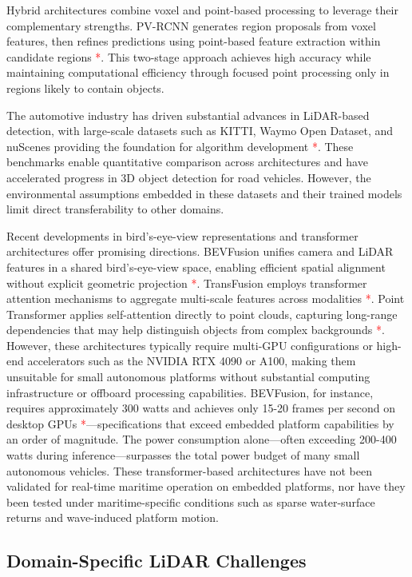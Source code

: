 \documentclass[../main.tex]{subfiles}
\begin{document}
Hybrid architectures combine voxel and point-based processing to leverage their complementary strengths. PV-RCNN generates region proposals from voxel features, then refines predictions using point-based feature extraction within candidate regions \textcolor{red}{*}. This two-stage approach achieves high accuracy while maintaining computational efficiency through focused point processing only in regions likely to contain objects.

The automotive industry has driven substantial advances in LiDAR-based detection, with large-scale datasets such as KITTI, Waymo Open Dataset, and nuScenes providing the foundation for algorithm development \textcolor{red}{*}. These benchmarks enable quantitative comparison across architectures and have accelerated progress in 3D object detection for road vehicles. However, the environmental assumptions embedded in these datasets and their trained models limit direct transferability to other domains.

Recent developments in bird's-eye-view representations and transformer architectures offer promising directions. BEVFusion unifies camera and LiDAR features in a shared bird's-eye-view space, enabling efficient spatial alignment without explicit geometric projection \textcolor{red}{*}. TransFusion employs transformer attention mechanisms to aggregate multi-scale features across modalities \textcolor{red}{*}. Point Transformer applies self-attention directly to point clouds, capturing long-range dependencies that may help distinguish objects from complex backgrounds \textcolor{red}{*}. However, these architectures typically require multi-GPU configurations or high-end accelerators such as the NVIDIA RTX 4090 or A100, making them unsuitable for small autonomous platforms without substantial computing infrastructure or offboard processing capabilities. BEVFusion, for instance, requires approximately 300 watts and achieves only 15-20 frames per second on desktop GPUs \textcolor{red}{*}—specifications that exceed embedded platform capabilities by an order of magnitude. The power consumption alone—often exceeding 200-400 watts during inference—surpasses the total power budget of many small autonomous vehicles. These transformer-based architectures have not been validated for real-time maritime operation on embedded platforms, nor have they been tested under maritime-specific conditions such as sparse water-surface returns and wave-induced platform motion.

\subsection{Domain-Specific LiDAR Challenges}
\end{document}
